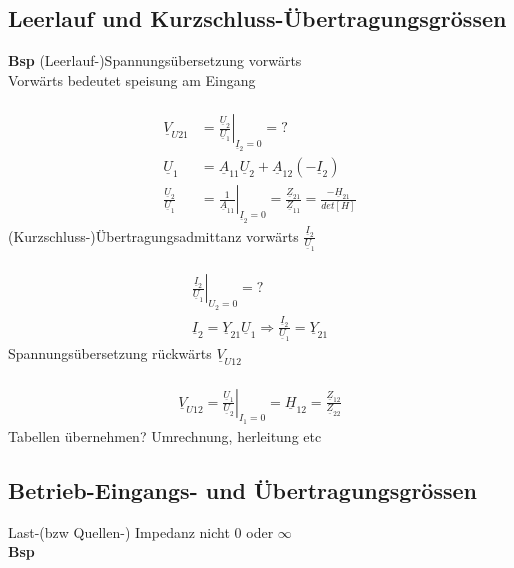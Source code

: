 \subsection{Leerlauf und Kurzschluss-Übertragungsgrössen}
\textbf{Bsp} (Leerlauf-)Spannungsübersetzung vorwärts\\
Vorwärts bedeutet speisung am Eingang\\
\\
\begin{align}
	\underline{V}_{U21}&=\left.\frac{\underline{U}_2}{\underline{U}_1}\right|_{\underline{I}_2=0}=?\nonumber\\
	\underline{U}_1&=\underline{A}_{11}\underline{U}_{2}+\underline{A}_{12}\left(-\underline{I}_2\right)\nonumber\\
	\frac{\underline{U}_2}{\underline{U}_1}&=\left.\frac{1}{\underline{A}_{11}}\right|_{\underline{I}_2=0}=\frac{\underline{Z}_{21}}{\underline{Z}_{11}}=\frac{-\underline{H}_{21}}{det[H]}\nonumber
\end{align}
(Kurzschluss-)Übertragungsadmittanz vorwärts
$\frac{\underline{I}_2}{\underline{U}_1}$\\
\\
\begin{align}
	\left.\frac{\underline{I}_2}{\underline{U}_1}\right|_{U_2=0}=?\nonumber\\
	\underline{I}_2=\underline{Y}_{21}\underline{U}_1\Rightarrow\frac{\underline{I}_2}{\underline{U}_1}=\underline{Y}_{21}\nonumber
\end{align}
Spannungsübersetzung rückwärts $\underline{V}_{U12}$\\
\\
\begin{align}
	\underline{V}_{U12}=\left.\frac{\underline{U}_1}{\underline{U}_2}\right|_{I_1=0}=\underline{H}_{12}=\frac{\underline{Z}_{12}}{\underline{Z}_{22}}\nonumber
\end{align}
Tabellen übernehmen? Umrechnung, herleitung etc\\
\subsection{Betrieb-Eingangs- und Übertragungsgrössen}
Last-(bzw Quellen-) Impedanz nicht $0$ oder $\infty$ \\
\textbf{Bsp} \\
